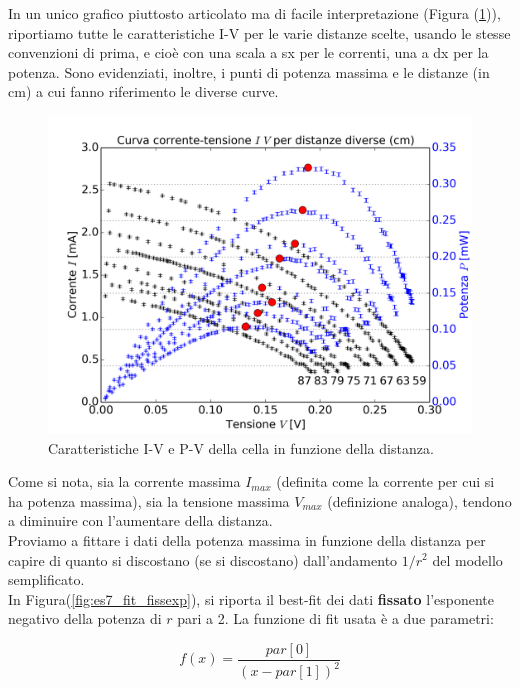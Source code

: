 \documentclass[journal, a4paper]{IEEEtran}
\begin{document}
In un unico grafico piuttosto articolato ma di facile interpretazione (Figura (\ref{fig:es7_prova})), riportiamo tutte le caratteristiche I-V per le varie distanze scelte, usando le stesse convenzioni di prima, e cioè con una scala a sx per le correnti, una a dx per la potenza. Sono evidenziati, inoltre, i punti di potenza massima e le distanze (in cm) a cui fanno riferimento le diverse curve. \\

\begin{figure}
\centering
\includegraphics[width=1\linewidth]{./es7_prova}
\caption{Caratteristiche I-V e P-V della cella in funzione della distanza.}
\label{fig:es7_prova}
\end{figure}

Come si nota, sia la corrente massima $I_{max}$ (definita come la corrente per cui si ha potenza massima), sia la tensione massima $V_{max}$ (definizione analoga), tendono a diminuire con l'aumentare della distanza.\\

Proviamo a fittare i dati della potenza massima in funzione della distanza per capire di quanto si discostano (se si discostano) dall'andamento $1/r^2$ del modello semplificato.\\
In Figura(\ref{fig:es7_fit_fissexp}), si riporta il best-fit dei dati \textbf{fissato} l'esponente negativo della potenza di $r$ pari a 2. La funzione di fit usata è a due parametri:

\begin{equation}
f(x) = \frac{par[0]}{(x-par[1])^2}
\end{equation}
\end{document}
